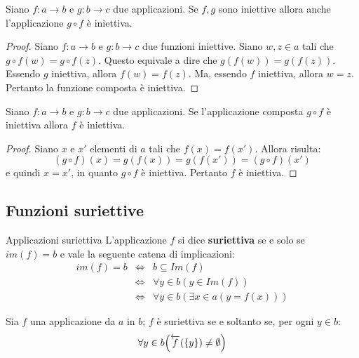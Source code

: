 \begin{propbox}
	Siano $f:a \longrightarrow b$ e $g: b \longrightarrow c$ due applicazioni. Se $f,g$ sono iniettive allora anche l'applicazione $g \circ f$ è iniettiva.
\end{propbox}

\begin{proof}
	Siano $f: a \longrightarrow b$ e $g: b \longrightarrow c$ due funzioni iniettive. Siano $w,z \in a$ tali che $g \circ f(w) = g \circ f(z)$. Questo equivale a dire che $g(f(w)) = g(f(z))$. Essendo $g$ iniettiva, allora $f(w) = f(z)$. Ma, essendo $f$ iniettiva, allora $w=z$. Pertanto la funzione composta è iniettiva.
\end{proof}

\begin{propbox}
	Siano $f:a \longrightarrow b$ e $g: b \longrightarrow c$ due applicazioni. Se l'applicazione composta $g \circ f$ è iniettiva allora $f$ è iniettiva.
\end{propbox}
\begin{proof}
	Siano $x$ e $x'$ elementi di $a$ tali che $f(x)=f(x')$. Allora risulta:
	\begin{displaymath}
		(g \circ f)(x) = g(f(x)) = g(f(x'))=(g \circ f)(x')
	\end{displaymath}
	e quindi $x=x'$, in quanto $g \circ f$ è iniettiva. Pertanto $f$ è iniettiva.
\end{proof}

\subsection{Funzioni suriettive}
\begin{defbox}{Applicazioni suriettiva}
	L'applicazione $f$ si dice \textbf{suriettiva} se e solo se $im(f)=b$ e vale la seguente catena di implicazioni:
	\begin{eqnarray}\label{def:suriettività}
		im(f)=b &\iff & b \subseteq Im(f) \\
		& \iff & \forall y \in b ( y \in Im(f))  \\
		& \iff & \forall y \in b ( \exists x \in a ( y= f(x)))
	\end{eqnarray}
\end{defbox}

\begin{propbox}
	Sia $f$ una applicazione da $a$ in $b$; $f$ è suriettiva se e soltanto se, per ogni $y \in b$:
	\begin{equation}
		\forall y \in b \Bigl( \overleftarrow{f}(\{y\}) \neq \emptyset \Bigr)
	\end{equation}
\end{propbox}

